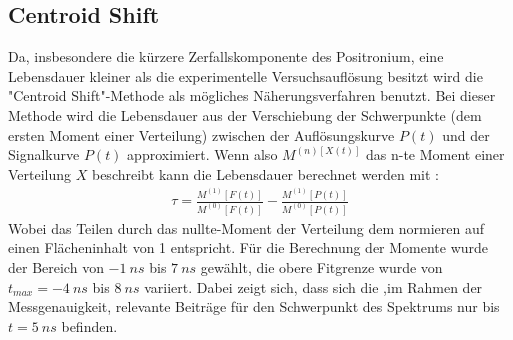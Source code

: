 \documentclass[a4paper,12pt]{article}
\begin{document}
\subsection{Centroid Shift}
Da, insbesondere die kürzere Zerfallskomponente des Positronium, eine Lebensdauer kleiner als die experimentelle Versuchsauflösung besitzt wird die "Centroid Shift"-Methode \cite{manual}
als mögliches Näherungsverfahren benutzt. Bei dieser Methode wird die Lebensdauer aus der Verschiebung der Schwerpunkte (dem ersten Moment einer Verteilung)
zwischen der Auflösungskurve $P(t)$ und der Signalkurve $P(t)$ approximiert.
Wenn also $M^{(n)[X(t)]}$ das n-te Moment einer Verteilung $X$ beschreibt kann die Lebensdauer berechnet werden mit \cite{manual} :
\begin{align*}
	\tau = \frac{M^{(1)}[F(t)]}{M^{(0)}[F(t)]} - \frac{M^{(1)}[P(t)]}{M^{(0)}[P(t)] }
\end{align*}
Wobei das Teilen durch das nullte-Moment der Verteilung dem normieren auf einen Flächeninhalt von 1 entspricht.
Für die Berechnung der Momente wurde der Bereich von $\SI{-1}{ns}$ bis $\SI{7}{ns}$ gewählt, die obere Fitgrenze wurde von $t_{max}=\SI{-4}{ns}$ bis $\SI{8}{ns}$ variiert. Dabei zeigt sich, dass
sich die ,im Rahmen der Messgenauigkeit, relevante Beiträge für den Schwerpunkt des Spektrums nur bis  $t=\SI{5}{ns}$ befinden. 
\end{document}
